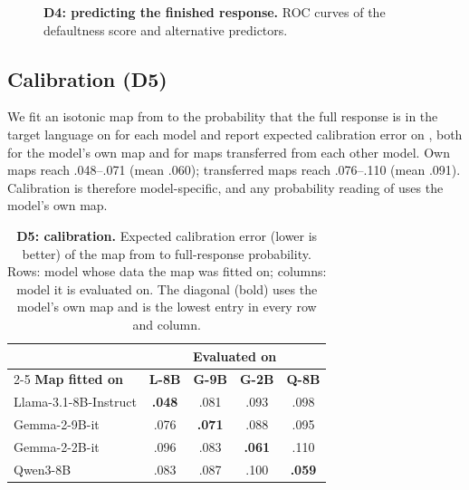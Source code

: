\begin{figure}[!htbp]
  \centering
  \caption{\textbf{D4: predicting the finished response.} ROC curves of the defaultness score and alternative predictors.}
  \label{fig:app-roc}
\end{figure}

\FloatBarrier
\subsection{Calibration (D5)}

We fit an isotonic map from \dM to the probability that the full response is in the target language on \Ddev for each model and report expected calibration error \citep{guo2017calibration} on \Deval, both for the model's own map and for maps transferred from each other model. Own maps reach .048--.071 (mean .060); transferred maps reach .076--.110 (mean .091). Calibration is therefore model-specific, and any probability reading of \dM uses the model's own map.

\begin{table}[!htbp]
  \centering
  \footnotesize
  \setlength{\tabcolsep}{3pt}
  \begin{tabular}{@{}lcccc@{}}
    \toprule
    & \multicolumn{4}{c}{\textbf{Evaluated on}} \\
    \cmidrule(l){2-5}
    \textbf{Map fitted on} & \textbf{L-8B} & \textbf{G-9B} & \textbf{G-2B} & \textbf{Q-8B} \\
    \midrule
    Llama-3.1-8B-Instruct  & \textbf{.048} & .081 & .093 & .098 \\
    Gemma-2-9B-it          & .076 & \textbf{.071} & .088 & .095 \\
    Gemma-2-2B-it          & .096 & .083 & \textbf{.061} & .110 \\
    Qwen3-8B               & .083 & .087 & .100 & \textbf{.059} \\
    \bottomrule
  \end{tabular}
  \caption{\textbf{D5: calibration.} Expected calibration error (lower is better) of the map from \dM to full-response probability. Rows: model whose \Ddev data the map was fitted on; columns: model it is evaluated on. The diagonal (bold) uses the model's own map and is the lowest entry in every row and column.}
  \label{tab:app-calibration}
\end{table}

